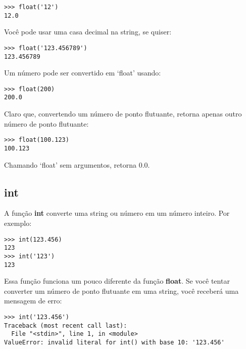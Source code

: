 \begin{listing}
\begin{verbatim}
>>> float('12')
12.0
\end{verbatim}
\end{listing}

\noindent
Você pode usar uma casa decimal na string, se quiser:

\begin{listing}
\begin{verbatim}
>>> float('123.456789')
123.456789
\end{verbatim}
\end{listing}

\noindent
Um número pode ser convertido em `float' usando:

\begin{listing}
\begin{verbatim}
>>> float(200)
200.0
\end{verbatim}
\end{listing}

\noindent
Claro que, convertendo um número de ponto flutuante, retorna apenas outro número de ponto flutuante:

\begin{listing}
\begin{verbatim}
>>> float(100.123)
100.123
\end{verbatim}
\end{listing}

\noindent
Chamando `float' sem argumentos, retorna 0.0.

\subsection*{int}

A função \textbf{int} converte uma string ou número em um número inteiro. Por exemplo:

\begin{listing}
\begin{verbatim}
>>> int(123.456)
123
>>> int('123')
123
\end{verbatim}
\end{listing}

Essa função funciona um pouco diferente da função \textbf{float}. Se você tentar converter um número de ponto flutuante em uma string, você receberá uma mensagem de erro:

\begin{listing}
\begin{verbatim}
>>> int('123.456')
Traceback (most recent call last):
  File "<stdin>", line 1, in <module>
ValueError: invalid literal for int() with base 10: '123.456'
\end{verbatim}
\end{listing}

